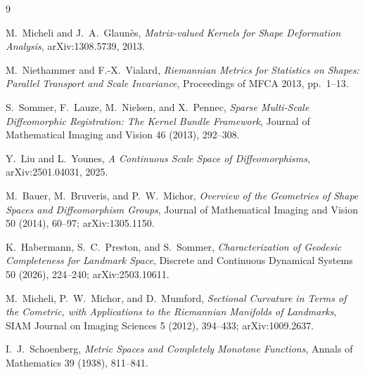 \documentclass[11pt]{article}
\begin{document}
\begin{thebibliography}{9}

M.~Micheli and J.~A.~Glaun\`es,
\emph{Matrix-valued Kernels for Shape Deformation Analysis},
arXiv:1308.5739, 2013.

M.~Niethammer and F.-X.~Vialard,
\emph{Riemannian Metrics for Statistics on Shapes:
Parallel Transport and Scale Invariance},
Proceedings of MFCA 2013, pp.~1--13.

S.~Sommer, F.~Lauze, M.~Nielsen, and X.~Pennec,
\emph{Sparse Multi-Scale Diffeomorphic Registration:
The Kernel Bundle Framework},
Journal of Mathematical Imaging and Vision 46 (2013), 292--308.

Y.~Liu and L.~Younes,
\emph{A Continuous Scale Space of Diffeomorphisms},
arXiv:2501.04031, 2025.

M.~Bauer, M.~Bruveris, and P.~W.~Michor,
\emph{Overview of the Geometries of Shape Spaces and Diffeomorphism Groups},
Journal of Mathematical Imaging and Vision 50 (2014), 60--97;
arXiv:1305.1150.

K.~Habermann, S.~C.~Preston, and S.~Sommer,
\emph{Characterization of Geodesic Completeness for Landmark Space},
Discrete and Continuous Dynamical Systems 50 (2026), 224--240;
arXiv:2503.10611.

M.~Micheli, P.~W.~Michor, and D.~Mumford,
\emph{Sectional Curvature in Terms of the Cometric, with Applications to the
Riemannian Manifolds of Landmarks},
SIAM Journal on Imaging Sciences 5 (2012), 394--433;
arXiv:1009.2637.

I.~J.~Schoenberg,
\emph{Metric Spaces and Completely Monotone Functions},
Annals of Mathematics 39 (1938), 811--841.

\end{thebibliography}
\end{document}
